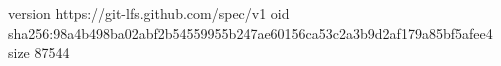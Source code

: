 version https://git-lfs.github.com/spec/v1
oid sha256:98a4b498ba02abf2b54559955b247ae60156ca53c2a3b9d2af179a85bf5afee4
size 87544
